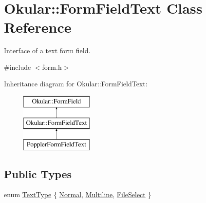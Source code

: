 \hypertarget{classOkular_1_1FormFieldText}{\section{Okular\+:\+:Form\+Field\+Text Class Reference}
\label{classOkular_1_1FormFieldText}
}


Interface of a text form field.  




{\ttfamily \#include $<$form.\+h$>$}

Inheritance diagram for Okular\+:\+:Form\+Field\+Text\+:\begin{figure}[H]
\begin{center}
\leavevmode
\includegraphics[height=3.000000cm]{classOkular_1_1FormFieldText}
\end{center}
\end{figure}
\subsection*{Public Types}
\begin{DoxyCompactItemize}
\item 
enum \hyperlink{classOkular_1_1FormFieldText_a13b763ea02b44247df564b79996671ba}{Text\+Type} \{ \hyperlink{classOkular_1_1FormFieldText_a13b763ea02b44247df564b79996671baabf3d7517053b7298f8051cea7f0cf034}{Normal}, 
\hyperlink{classOkular_1_1FormFieldText_a13b763ea02b44247df564b79996671baa4cd572a2044a634f8df6a284f595dc2f}{Multiline}, 
\hyperlink{classOkular_1_1FormFieldText_a13b763ea02b44247df564b79996671baaeaeb6def433745650b1ffd5dacefc7e2}{File\+Select}
 \}
\end{DoxyCompactItemize}
